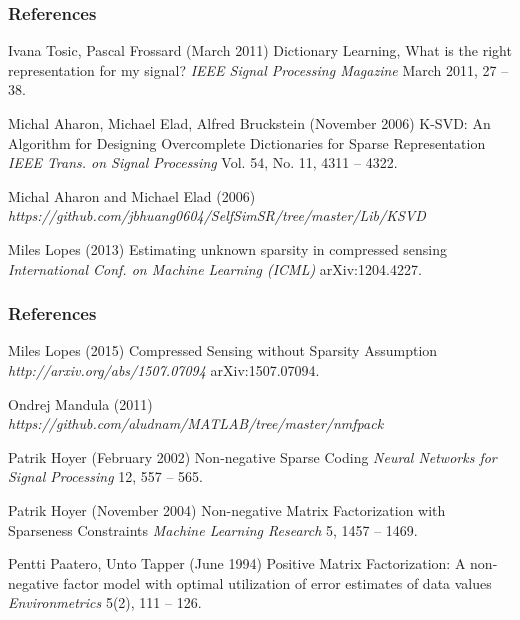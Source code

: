\documentclass{beamer}
\begin{document}
\begin{frame}
\frametitle{References}
\footnotesize{
\begin{thebibliography}{99}

 Ivana Tosic, Pascal Frossard (March 2011)
\newblock Dictionary Learning, What is the right representation for my signal?
\newblock \emph{IEEE Signal Processing Magazine} March 2011, 27 -- 38.

 Michal Aharon, Michael Elad, Alfred Bruckstein (November 2006)
\newblock K-SVD: An Algorithm for Designing Overcomplete Dictionaries for Sparse Representation
\newblock \emph{IEEE Trans. on Signal Processing} Vol. 54, No. 11, 4311 -- 4322.

 Michal Aharon and Michael Elad (2006)
\newblock \emph{https://github.com/jbhuang0604/SelfSimSR/tree/master/Lib/KSVD}

 Miles Lopes (2013)
\newblock Estimating unknown sparsity in compressed sensing
\newblock \emph{International Conf. on Machine Learning (ICML)} arXiv:1204.4227.

\end{thebibliography}
}
\end{frame}

\begin{frame}
\frametitle{References}
\footnotesize{
\begin{thebibliography}{99}

 Miles Lopes (2015)
\newblock Compressed Sensing without Sparsity Assumption
\newblock \emph{http://arxiv.org/abs/1507.07094} arXiv:1507.07094.

 Ondrej Mandula (2011)
\newblock \emph{https://github.com/aludnam/MATLAB/tree/master/nmfpack}

 Patrik Hoyer (February 2002)
\newblock Non-negative Sparse Coding
\newblock \emph{Neural Networks for Signal Processing} 12, 557 -- 565.

 Patrik Hoyer (November 2004)
\newblock Non-negative Matrix Factorization with Sparseness Constraints
\newblock \emph{Machine Learning Research} 5, 1457 -- 1469.

 Pentti Paatero, Unto Tapper (June 1994)
\newblock Positive Matrix Factorization: A non-negative factor model with optimal utilization of error estimates of data values
\newblock \emph{Environmetrics} 5(2), 111 -- 126.

\end{thebibliography}
}
\end{frame}

\end{document}

